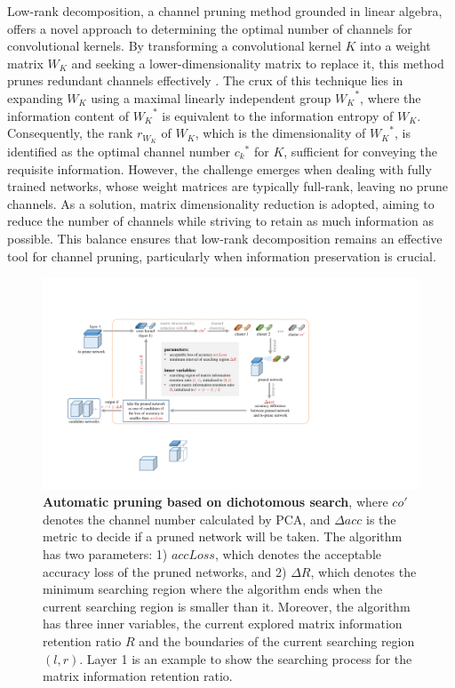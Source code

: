 \documentclass[sigconf, 10pt]{acmart}
\begin{document}
Low-rank decomposition, a channel pruning method grounded in linear algebra, offers a novel approach to determining the optimal number of channels for convolutional kernels. By transforming a convolutional kernel \( K \) into a weight matrix \( W_K \) and seeking a lower-dimensionality matrix to replace it, this method prunes redundant channels effectively \cite{2020Low}. The crux of this technique lies in expanding \( W_K \) using a maximal linearly independent group \( {W_K}^* \), where the information content of \( {W_K}^* \) is equivalent to the information entropy of \( W_K \). Consequently, the rank \( r_{W_K} \) of \( W_K \), which is the dimensionality of \( {W_K}^* \), is identified as the optimal channel number \( {c_k}^* \) for \( K \), sufficient for conveying the requisite information. However, the challenge emerges when dealing with fully trained networks, whose weight matrices are typically full-rank, leaving no prune channels. As a solution, matrix dimensionality reduction is adopted, aiming to reduce the number of channels while striving to retain as much information as possible. This balance ensures that low-rank decomposition remains an effective tool for channel pruning, particularly when information preservation is crucial.


\begin{figure}[t]
  \centering
  \includegraphics[width=\linewidth]{Fig5.pdf}
   \caption{\textbf{Automatic pruning based on dichotomous search}, where $co'$ denotes the channel number calculated by PCA, and $\Delta acc$ is the metric to decide if a pruned network will be taken. The algorithm has two parameters: 1) $accLoss$, which denotes the acceptable accuracy loss of the pruned networks, and 2) $\Delta R$, which denotes the minimum searching region where the algorithm ends when the current searching region is smaller than it. Moreover, the algorithm has three inner variables, the current explored matrix information retention ratio $R$ and the boundaries of the current searching region $(l,r)$. Layer 1 is an example to show the searching process for the matrix information retention ratio.}
   \label{fig:5}
\end{figure}
\end{document}
